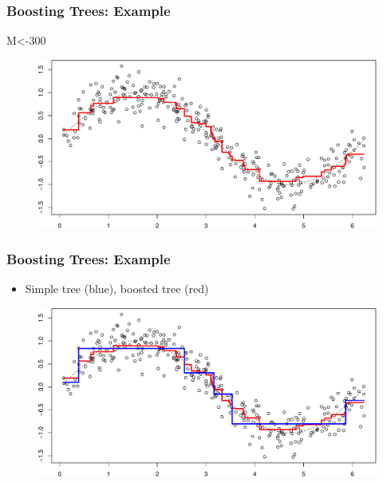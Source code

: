 \documentclass[
  shownotes,
  xcolor={svgnames},
  hyperref={colorlinks,citecolor=DarkBlue,linkcolor=DarkRed,urlcolor=DarkBlue}
  , aspectratio=169]{beamer}
\newenvironment{Shaded}{\begin{snugshade}}{\end{snugshade}}
\newcommand{\DecValTok}[1]{\textcolor[rgb]{0.00,0.00,0.81}{#1}}
\newcommand{\NormalTok}[1]{#1}
\begin{document}
\begin{frame}[fragile]
\frametitle{Boosting Trees: Example}

\begin{Shaded}
\begin{Highlighting}[]
\NormalTok{M\textless{}{-}}\DecValTok{300}

\end{Highlighting}
\end{Shaded}

\begin{figure}[H] \centering
            \captionsetup{justification=centering}
              \includegraphics[scale=0.5]{figures/unnamed-chunk-8-1.pdf}
 \end{figure}

 \end{frame}
\begin{frame}[fragile]
\frametitle{Boosting Trees: Example}

\begin{itemize}
\item Simple tree (blue), boosted tree (red)
\end{itemize}

\begin{figure}[H] \centering
            \captionsetup{justification=centering}
              \includegraphics[scale=0.5]{figures/unnamed-chunk-9-1.pdf}
 \end{figure}

 \end{frame}
\end{document}
